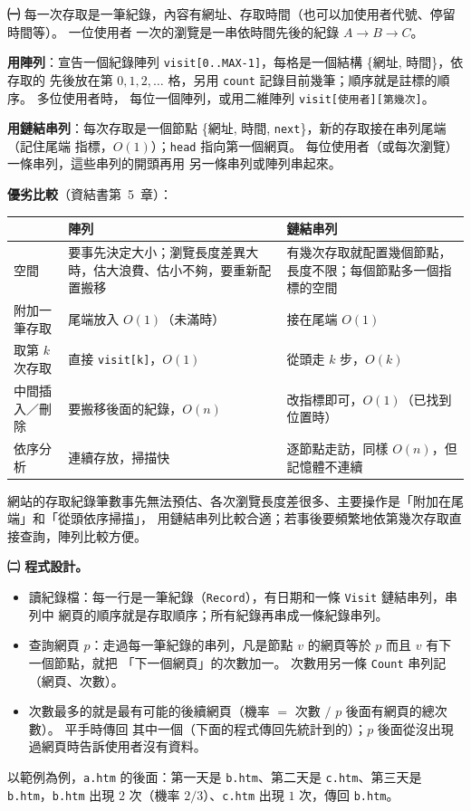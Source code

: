 \begin{pastsoln}
\textbf{㈠} 每一次存取是一筆紀錄，內容有網址、存取時間（也可以加使用者代號、停留時間等）。 一位使用者
一次的瀏覽是一串依時間先後的紀錄 $A \to B \to C$。

\textbf{用陣列}：宣告一個紀錄陣列 \texttt{visit[0..MAX-1]}，每格是一個結構 \{網址, 時間\}，依存取的
先後放在第 $0, 1, 2, \ldots$ 格，另用 \texttt{count} 記錄目前幾筆；順序就是註標的順序。 多位使用者時，
每位一個陣列，或用二維陣列 \texttt{visit[使用者][第幾次]}。

\textbf{用鏈結串列}：每次存取是一個節點 \{網址, 時間, \texttt{next}\}，新的存取接在串列尾端（記住尾端
指標，$O(1)$）；\texttt{head} 指向第一個網頁。 每位使用者（或每次瀏覽）一條串列，這些串列的開頭再用
另一條串列或陣列串起來。

\textbf{優劣比較}（資結書第~5~章）：
\begin{center}
\small
\begin{tabular}{p{3cm}p{5cm}p{5cm}}
\toprule
 & 陣列 & 鏈結串列 \\
\midrule
空間 & 要事先決定大小；瀏覽長度差異大時，估大浪費、估小不夠，要重新配置搬移 & 有幾次存取就配置幾個節點，長度不限；每個節點多一個指標的空間 \\
附加一筆存取 & 尾端放入 $O(1)$（未滿時） & 接在尾端 $O(1)$ \\
取第 $k$ 次存取 & 直接 \texttt{visit[k]}，$O(1)$ & 從頭走 $k$ 步，$O(k)$ \\
中間插入／刪除 & 要搬移後面的紀錄，$O(n)$ & 改指標即可，$O(1)$（已找到位置時） \\
依序分析 & 連續存放，掃描快 & 逐節點走訪，同樣 $O(n)$，但記憶體不連續 \\
\bottomrule
\end{tabular}
\end{center}
網站的存取紀錄筆數事先無法預估、各次瀏覽長度差很多、主要操作是「附加在尾端」和「從頭依序掃描」，
用鏈結串列比較合適；若事後要頻繁地依第幾次存取直接查詢，陣列比較方便。

\textbf{㈡ 程式設計。}
\begin{itemize}[nosep]
\item 讀紀錄檔：每一行是一筆紀錄（\texttt{Record}），有日期和一條 \texttt{Visit} 鏈結串列，串列中
網頁的順序就是存取順序；所有紀錄再串成一條紀錄串列。
\item 查詢網頁 $p$：走過每一筆紀錄的串列，凡是節點 $v$ 的網頁等於 $p$ 而且 $v$ 有下一個節點，就把
「下一個網頁」的次數加一。 次數用另一條 \texttt{Count} 串列記（網頁、次數）。
\item 次數最多的就是最有可能的後續網頁（機率 $=$ 次數 $/$ $p$ 後面有網頁的總次數）。 平手時傳回
其中一個（下面的程式傳回先統計到的）；$p$ 後面從沒出現過網頁時告訴使用者沒有資料。
\end{itemize}
以範例為例，\texttt{a.htm} 的後面：第一天是 \texttt{b.htm}、第二天是 \texttt{c.htm}、第三天是
\texttt{b.htm}，\texttt{b.htm} 出現 $2$ 次（機率 $2/3$）、\texttt{c.htm} 出現 $1$ 次，傳回 \texttt{b.htm}。


\end{pastsoln}
